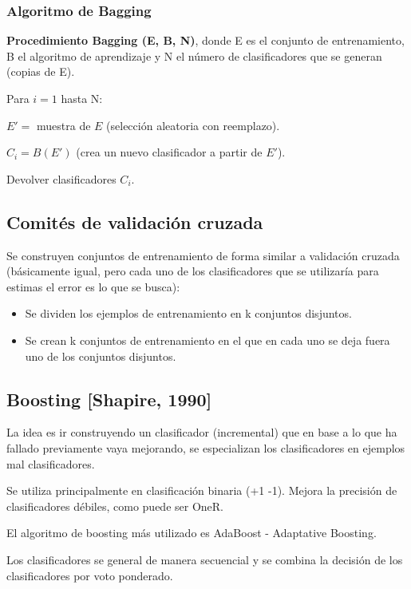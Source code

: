 \documentclass[12pt]{report} %
\begin{document}
\subsubsection{Algoritmo de Bagging}
\textbf{Procedimiento Bagging (E, B, N)}, donde E es el conjunto de entrenamiento, B el algoritmo de aprendizaje y N el número de clasificadores que se generan (copias de E).

Para $i = 1$ hasta N:

\hspace{6mm} $E' =$ muestra de $E$ (selección aleatoria con reemplazo).

\hspace{6mm} $C_i = B(E')$ (crea un nuevo clasificador a partir de $E'$).

Devolver clasificadores $C_i$.

\subsection{Comités de validación cruzada}
Se construyen conjuntos de entrenamiento de forma similar a validación cruzada (básicamente igual, pero cada uno de los clasificadores que se utilizaría para estimas el error es lo que se busca):
\begin{itemize}
  \item Se dividen los ejemplos de entrenamiento en k conjuntos disjuntos.
  \item Se crean k conjuntos de entrenamiento en el que en cada uno se deja fuera uno de los conjuntos disjuntos.
\end{itemize}

\subsection{Boosting [Shapire, 1990]}
La idea es ir construyendo un clasificador (incremental) que en base a lo que ha fallado previamente vaya mejorando, se especializan los clasificadores en ejemplos mal clasificadores.

Se utiliza principalmente en clasificación binaria (+1 -1). Mejora la precisión de clasificadores débiles, como puede ser OneR.

El algoritmo de boosting más utilizado es AdaBoost - Adaptative Boosting.

Los clasificadores se general de manera secuencial y se combina la decisión de los clasificadores por voto ponderado.
\end{document}
